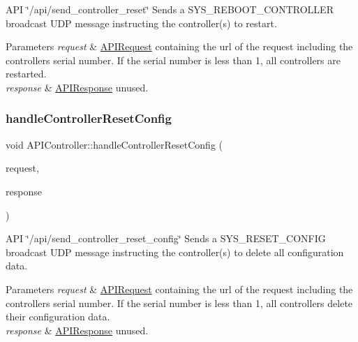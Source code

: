 A\+PI \char`\"{}/api/send\+\_\+controller\+\_\+reset\char`\"{} Sends a S\+Y\+S\+\_\+\+R\+E\+B\+O\+O\+T\+\_\+\+C\+O\+N\+T\+R\+O\+L\+L\+ER broadcast U\+DP message instructing the controller(s) to restart. 
\begin{DoxyParams}{Parameters}
{\em request} & \hyperlink{class_a_p_i_request}{A\+P\+I\+Request} containing the url of the request including the controller\textquotesingle{}s serial number. If the serial number is less than 1, all controllers are restarted. \\
\hline
{\em response} & \hyperlink{class_a_p_i_response}{A\+P\+I\+Response} unused. \\
\hline
\end{DoxyParams}
\mbox{\label{class_a_p_i_controller_a0d4deeaff703bb7d60eb344e6ee9f8cb}} 
\subsubsection{\texorpdfstring{handle\+Controller\+Reset\+Config}{handleControllerResetConfig}}
{\footnotesize\ttfamily void A\+P\+I\+Controller\+::handle\+Controller\+Reset\+Config (\begin{DoxyParamCaption}\item[{const \hyperlink{class_a_p_i_request}{A\+P\+I\+Request} \&}]{request,  }\item[{\hyperlink{class_a_p_i_response}{A\+P\+I\+Response} $\ast$}]{response }\end{DoxyParamCaption})\hspace{0.3cm}{\ttfamily [slot]}}

A\+PI \char`\"{}/api/send\+\_\+controller\+\_\+reset\+\_\+config\char`\"{} Sends a S\+Y\+S\+\_\+\+R\+E\+S\+E\+T\+\_\+\+C\+O\+N\+F\+IG broadcast U\+DP message instructing the controller(s) to delete all configuration data. 
\begin{DoxyParams}{Parameters}
{\em request} & \hyperlink{class_a_p_i_request}{A\+P\+I\+Request} containing the url of the request including the controller\textquotesingle{}s serial number. If the serial number is less than 1, all controllers delete their configuration data. \\
\hline
{\em response} & \hyperlink{class_a_p_i_response}{A\+P\+I\+Response} unused. \\
\hline
\end{DoxyParams}
\mbox{\label{class_a_p_i_controller_a3d32a4cf1f6a06697b09d43a2be140cf}} 
